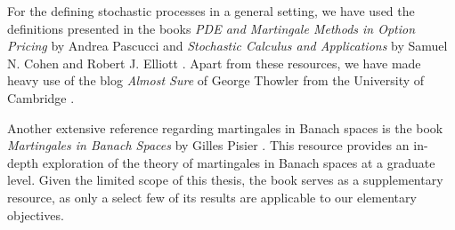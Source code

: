 For the defining stochastic processes in a general setting, we have used the definitions presented in the books \textit{PDE and Martingale Methods in Option Pricing} by Andrea Pascucci \cite{Pascucci_2011} and \textit{Stochastic Calculus and Applications} by Samuel N. Cohen and Robert J. Elliott \cite{Elliott_Cohen_1982}. Apart from these resources, we have made heavy use of the blog \textit{Almost Sure} of George Thowler from the University of Cambridge \cite{Thowler}.

Another extensive reference regarding martingales in Banach spaces is the book \textit{Martingales in Banach Spaces} by Gilles Pisier \cite{pisier_2016}. This resource provides an in-depth exploration of the theory of martingales in Banach spaces at a graduate level. Given the limited scope of this thesis, the book serves as a supplementary resource, as only a select few of its results are applicable to our elementary objectives.
